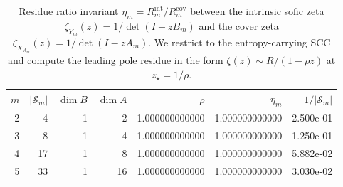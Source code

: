 \begin{table}[H]
\centering
\scriptsize
\setlength{\tabcolsep}{6pt}
\caption{Residue ratio invariant $\eta_m=R^{\mathrm{int}}_m/R^{\mathrm{cov}}_m$ between the intrinsic sofic zeta $\zeta_{Y_m}(z)=1/\det(I-zB_m)$ and the cover zeta $\zeta_{X_{A_m}}(z)=1/\det(I-zA_m)$. We restrict to the entropy-carrying SCC and compute the leading pole residue in the form $\zeta(z)\sim R/(1-\rho z)$ at $z_\star=1/\rho$.}
\label{tab:phi_m_sofic_residue_ratio}
\begin{tabular}{r r r r r r r}
\toprule
$m$ & $|\mathcal{S}_m|$ & $\dim B$ & $\dim A$ & $\rho$ & $\eta_m$ & $1/|\mathcal{S}_m|$\\
\midrule
2 & 4 & 1 & 2 & 1.000000000000 & 1.000000000000 & 2.500e-01\\
3 & 8 & 1 & 4 & 1.000000000000 & 1.000000000000 & 1.250e-01\\
4 & 17 & 1 & 8 & 1.000000000000 & 1.000000000000 & 5.882e-02\\
5 & 33 & 1 & 16 & 1.000000000000 & 1.000000000000 & 3.030e-02\\
\bottomrule
\end{tabular}
\end{table}
